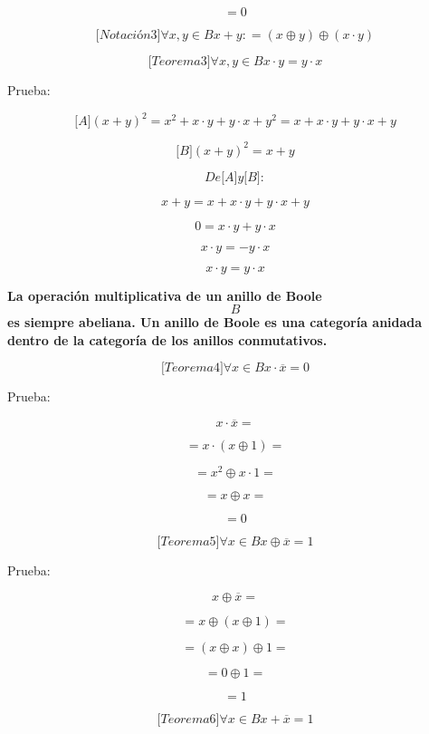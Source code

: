 \begin{enumerate}
\begin{enumerate}
\begin{enumerate}
      \[= 0\]

      \[{\lbrack{{Notación}3}\rbrack}\forall x,{y \in B}{x + y}{: = \left( {x \oplus y} \right)} \oplus \left( {x \cdot y} \right)\]

      \[{\lbrack{{Teorema}3}\rbrack}\forall x,{y \in B}{{x \cdot y} = {y \cdot x}}\]

      Prueba:

      \[{\lbrack A\rbrack}{{\left( {x + y} \right)^{2} = {{{x^{2} + {x \cdot y}} + {y \cdot x}} + y^{2}}} = {{{x + {x \cdot y}} + {y \cdot x}} + y}}\]

      \[{\lbrack B\rbrack}{\left( {x + y} \right)^{2} = {x + y}}\]

      \[\mathit{De}{\lbrack A\rbrack}y{\lbrack B\rbrack}:\]

      \[{x + y} = {{{x + {x \cdot y}} + {y \cdot x}} + y}\]

      \[0 = {{x \cdot y} + {y \cdot x}}\]

      \[{x \cdot y} = {{- y} \cdot x}\]

      \[{x \cdot y} = {y \cdot x}\]

      \textbf{La operación multiplicativa de un anillo de Boole \[B\] es
      siempre abeliana. Un anillo de Boole es una categoría anidada
      dentro de la categoría de los anillos conmutativos.}

      \[{\lbrack{{Teorema}4}\rbrack}\forall{x \in B}{{x \cdot \overline{x}} = 0}\]

      Prueba:

      \[{x \cdot \overline{x}} =\]

      \[{= {x \cdot \left( {x \oplus 1} \right)}} =\]

      \[{= {x^{2} \oplus {x \cdot 1}}} =\]

      \[{= {x \oplus x}} =\]

      \[= 0\]

      \[{\lbrack{{Teorema}5}\rbrack}\forall{x \in B}x \oplus {\overline{x} = 1}\]

      Prueba:

      \[x \oplus {\overline{x} =}\]

      \[{= {x \oplus \left( {x \oplus 1} \right)}} =\]

      \[{= \left( {x \oplus x} \right)} \oplus {1 =}\]

      \[{= {0 \oplus 1}} =\]

      \[= 1\]

      \[{\lbrack{{Teorema}6}\rbrack}\forall{x \in B}{{x + \overline{x}} = 1}\]


\end{enumerate}
\end{enumerate}
\end{enumerate}
